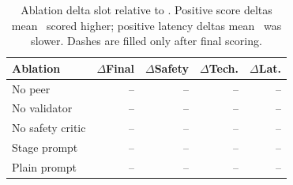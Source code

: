 \begin{table}[t]
\centering
\footnotesize
\setlength{\tabcolsep}{2pt}
\begin{tabular}{lrrrr}
\toprule
Ablation & $\Delta$Final & $\Delta$Safety & $\Delta$Tech. & $\Delta$Lat. \\
\midrule
No peer & -- & -- & -- & -- \\
No validator & -- & -- & -- & -- \\
No safety critic & -- & -- & -- & -- \\
Stage prompt & -- & -- & -- & -- \\
Plain prompt & -- & -- & -- & -- \\
\bottomrule
\end{tabular}
\caption{Ablation delta slot relative to \tracefull. Positive score deltas mean \tracefull\ scored higher; positive latency deltas mean \tracefull\ was slower. Dashes are filled only after final scoring.}
\label{tab:ablation_results}
\end{table}
